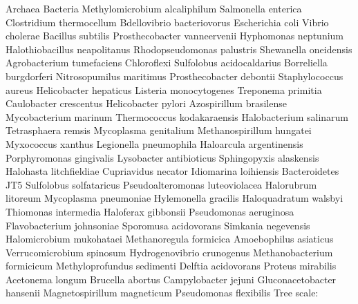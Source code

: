 \documentclass[]{tufte-book}
\begin{document}
Archaea
Bacteria
Methylomicrobium alcaliphilum
Salmonella enterica
Clostridium thermocellum
Bdellovibrio bacteriovorus
Escherichia coli
Vibrio cholerae
Bacillus subtilis
Prosthecobacter vanneervenii
Hyphomonas neptunium
Halothiobacillus neapolitanus
Rhodopseudomonas palustris
Shewanella oneidensis
Agrobacterium tumefaciens
Chloroflexi
Sulfolobus acidocaldarius
Borreliella burgdorferi
Nitrosopumilus maritimus
Prosthecobacter debontii
Staphylococcus aureus
Helicobacter hepaticus
Listeria monocytogenes
Treponema primitia
Caulobacter crescentus
Helicobacter pylori
Azospirillum brasilense
Mycobacterium marinum
Thermococcus kodakaraensis
Halobacterium salinarum
Tetrasphaera remsis
Mycoplasma genitalium
Methanospirillum hungatei
Myxococcus xanthus
Legionella pneumophila
Haloarcula argentinensis
Porphyromonas gingivalis
Lysobacter antibioticus
Sphingopyxis alaskensis
Halohasta litchfieldiae
Cupriavidus necator
Idiomarina loihiensis
Bacteroidetes JT5
Sulfolobus solfataricus
Pseudoalteromonas luteoviolacea
Halorubrum litoreum
Mycoplasma pneumoniae
Hylemonella gracilis
Haloquadratum walsbyi
Thiomonas intermedia
Haloferax gibbonsii
Pseudomonas aeruginosa
Flavobacterium johnsoniae
Sporomusa acidovorans
Simkania negevensis
Halomicrobium mukohataei
Methanoregula formicica
Amoebophilus asiaticus
Verrucomicrobium spinosum
Hydrogenovibrio crunogenus
Methanobacterium formicicum
Methyloprofundus sedimenti
Delftia acidovorans
Proteus mirabilis
Acetonema longum
Brucella abortus
Campylobacter jejuni
Gluconacetobacter hansenii
Magnetospirillum magneticum
Pseudomonas flexibilis
Tree scale:
\end{document}
